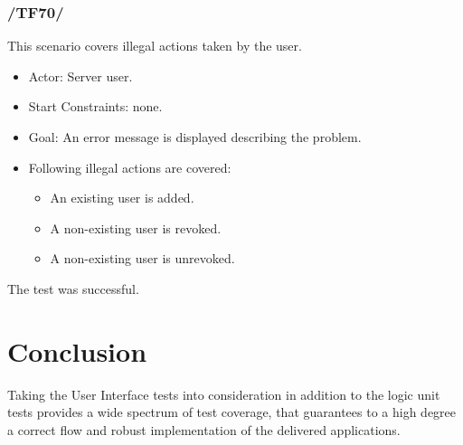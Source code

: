 \documentclass[a4paper,10pt]{scrartcl}
\begin{document}
\subsubsection{/TF70/}
This scenario covers illegal actions taken by the user.

\begin{itemize}
	\item Actor: Server user.
	\item Start Constraints: none.
	\item Goal: An error message is displayed describing the problem.
	\item Following illegal actions are covered:
	\begin{itemize}
   \item An existing user is added.
   \item A non-existing user is revoked.
   \item A non-existing user is unrevoked.
\end{itemize}
\end{itemize}
The test was successful.

\section{Conclusion}
Taking the User Interface tests into consideration in addition to the logic unit tests provides a wide spectrum of test coverage, that guarantees to a high degree a correct flow and robust implementation of the delivered applications.
  
\end{document}
